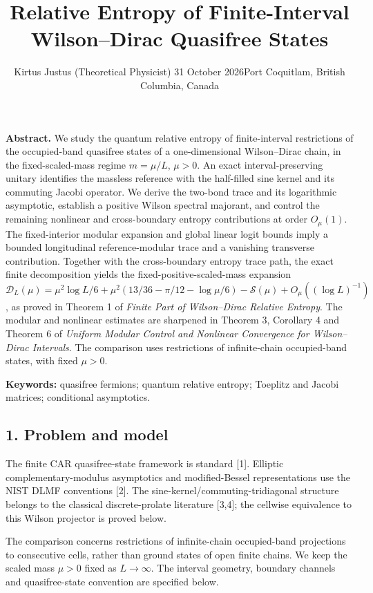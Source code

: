 \documentclass[
  10pt,
  a4paper,
]{article}
\title{Relative Entropy of Finite-Interval Wilson--Dirac Quasifree States}
\author{Kirtus Justus (Theoretical Physicist) \textbullet{} 31 October 2026\tabularnewline Port Coquitlam, British Columbia, Canada}
\date{}
\begin{document}
\maketitle

\textbf{Abstract.} We study the quantum relative entropy of finite-interval restrictions of the occupied-band quasifree states of a one-dimensional Wilson--Dirac chain, in the fixed-scaled-mass regime \(m=\mu/L\), \(\mu>0\). An exact interval-preserving unitary identifies the massless reference with the half-filled sine kernel and its commuting Jacobi operator. We derive the two-bond trace and its logarithmic asymptotic, establish a positive Wilson spectral majorant, and control the remaining nonlinear and cross-boundary entropy contributions at order \(O_\mu(1)\). The fixed-interior modular expansion and global linear logit bounds imply a bounded longitudinal reference-modular trace and a vanishing transverse contribution. Together with the cross-boundary entropy trace path, the exact finite decomposition yields the fixed-positive-scaled-mass expansion \(\mathcal D_L(\mu)=\mu^2\log L/6+\mu^2(13/36-\pi/12-\log\mu/6)-\mathcal S(\mu)+O_\mu((\log L)^{-1})\), as proved in Theorem 1 of \emph{Finite Part of Wilson--Dirac Relative Entropy}. The modular and nonlinear estimates are sharpened in Theorem 3, Corollary 4 and Theorem 6 of \emph{Uniform Modular Control and Nonlinear Convergence for Wilson--Dirac Intervals}. The comparison uses restrictions of infinite-chain occupied-band states, with fixed \(\mu>0\).

\textbf{Keywords:} quasifree fermions; quantum relative entropy; Toeplitz and Jacobi matrices; conditional asymptotics.

\subsection{1. Problem and model}\label{problem-and-model}

The finite CAR quasifree-state framework is standard {[}1{]}. Elliptic complementary-modulus asymptotics and modified-Bessel representations use the NIST DLMF conventions {[}2{]}. The sine-kernel/commuting-tridiagonal structure belongs to the classical discrete-prolate literature {[}3,4{]}; the cellwise equivalence to this Wilson projector is proved below.

The comparison concerns restrictions of infinite-chain occupied-band projections to consecutive cells, rather than ground states of open finite chains. We keep the scaled mass \(\mu>0\) fixed as \(L\to\infty\). The interval geometry, boundary channels and quasifree-state convention are specified below.
\end{document}
